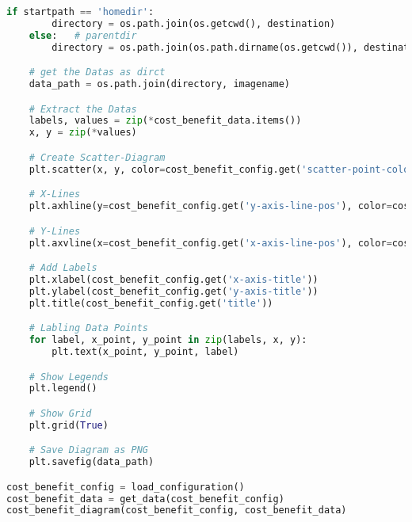 \begin{lstlisting}[language=python, caption=Python LaTex - cost_benefit_diagram - Kosten-Nutzen-Diagramm,captionpos=b,label={lst:cost_benefit_diagram},breaklines=true]
    if startpath == 'homedir':
        directory = os.path.join(os.getcwd(), destination)
    else:   # parentdir
        directory = os.path.join(os.path.dirname(os.getcwd()), destination)

    # get the Datas as dirct
    data_path = os.path.join(directory, imagename)

    # Extract the Datas
    labels, values = zip(*cost_benefit_data.items())
    x, y = zip(*values)

    # Create Scatter-Diagram
    plt.scatter(x, y, color=cost_benefit_config.get('scatter-point-color'))

    # X-Lines
    plt.axhline(y=cost_benefit_config.get('y-axis-line-pos'), color=cost_benefit_config.get('y-axis-line-color'), linestyle=cost_benefit_config.get('y-axis-line-type'), label=cost_benefit_config.get('y-axis-line-label'))

    # Y-Lines
    plt.axvline(x=cost_benefit_config.get('x-axis-line-pos'), color=cost_benefit_config.get('x-axis-line-color'), linestyle=cost_benefit_config.get('x-axis-line-type'), label=cost_benefit_config.get('x-axis-line-label'))

    # Add Labels
    plt.xlabel(cost_benefit_config.get('x-axis-title'))
    plt.ylabel(cost_benefit_config.get('y-axis-title'))
    plt.title(cost_benefit_config.get('title'))

    # Labling Data Points
    for label, x_point, y_point in zip(labels, x, y):
        plt.text(x_point, y_point, label)

    # Show Legends
    plt.legend()

    # Show Grid
    plt.grid(True)

    # Save Diagram as PNG
    plt.savefig(data_path)

cost_benefit_config = load_configuration()
cost_benefit_data = get_data(cost_benefit_config)
cost_benefit_diagram(cost_benefit_config, cost_benefit_data)
\end{lstlisting}
